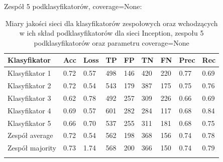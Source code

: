 \documentclass[polish,12pt]{aghthesis}
\begin{document}
\vspace{3mm}
\noindent Zespół 5 podklasyfikatorów, coverage=None:
\renewcommand{\arraystretch}{1.75}
 \begin{longtable}[h!]{|m{2.6cm}|m{1.2cm}|m{1.2cm}|m{1.2cm}|m{1.2cm}|m{1.2cm}|m{1.2cm}|m{1.2cm}|m{1.2cm}|}
 \hline
 Klasyfikator & Acc & Loss & TP & FP & TN & FN & Prec & Rec\\
 \hline
 Klasyfikator 1 & 0.72 & 0.57 & 498 & 146 & 420 & 220 & 0.77 & 0.69\\
 \hline
 Klasyfikator 2 & 0.72 & 0.54 & 543 & 179 & 387 & 175 & 0.75 & 0.76\\
 \hline
 Klasyfikator 3 & 0.62 & 0.78 & 492 & 257 & 309 & 226 & 0.66 & 0.69\\
 \hline
 Klasyfikator 4 & 0.69 & 0.57 & 601 & 282 & 284 & 117 & 0.68 & 0.84\\
 \hline
 Klasyfikator 5 & 0.66 & 0.70 & 537 & 255 & 311 & 181 & 0.68 & 0.75\\
 \hline
 Zespół average & 0.72 & 0.54 & 562 & 198 & 368 & 156 & 0.74 & 0.78\\ 
 \hline
 Zespół \newline majority & 0.73 & 1.74 & 568 & 200 & 366 & 150 & 0.74 & 0.79\\
 \hline
\caption{Miary jakości sieci dla klasyfikatorów zespołowych oraz wchodzących w ich skład podklasyfikatorów dla sieci Inception, zespołu 5 podklasyfikatorów oraz parametru coverage=None}
\label{table:26}
\end{longtable}
\end{document}
